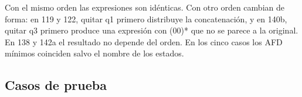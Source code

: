 Con el mismo orden las expresiones son idénticas. Con otro orden cambian de forma: en 119 y 122, quitar q1 primero distribuye la concatenación, y en 140b, quitar q3 primero produce una expresión con (00)* que no se parece a la original. En 138 y 142a el resultado no depende del orden. En los cinco casos los AFD mínimos coinciden salvo el nombre de los estados.


\hypertarget{casos-de-prueba}{%
\subsection{Casos de prueba}\label{casos-de-prueba}}

